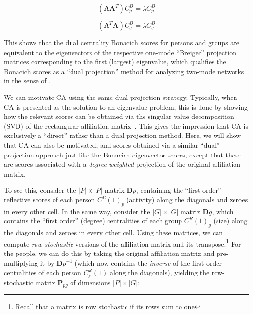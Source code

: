 \documentclass[a4paper,fleqn]{cas-sc}
\begin{document}
\begin{equation}
    \left(\mathbf{AA}^T\right)C^B_p = \lambda C^B_p
    \label{eq:bon3}
\end{equation}

\begin{equation}
    \left(\mathbf{A}^T\mathbf{A}\right)C^B_g = \lambda C^B_g
    \label{eq:bon4}
\end{equation}

This shows that the dual centrality Bonacich scores for persons and groups are equivalent to the eigenvectors of the respective one-mode ``Breiger'' \citeyearpar{breiger1974duality} projection matrices corresponding to the first (largest) eigenvalue, which qualifies the Bonacich scores as a ``dual projection'' method for analyzing two-mode networks in the sense of \citet{everett2013dual}.

We can motivate CA using the same dual projection strategy. Typically, when CA is presented as the solution to an eigenvalue problem, this is done by showing how the relevant scores can be obtained via the singular value decomposition (SVD) of the rectangular affiliation matrix~\citep{borgatti1997network, bonacich1991simultaneous, faust1997centrality, faust2005using}. This gives the impression that CA is exclusively a ``direct'' rather than a dual projection method. Here, we will show that CA can also be motivated, and scores obtained via a similar ``dual'' projection approach just like the Bonacich eigenvector scores, except that these are scores associated with a \textit{degree-weighted} projection of the original affiliation matrix.

To see this, consider the $|P| \times |P|$ matrix $\mathbf{D}p$, containing the ``first order'' reflective scores of each person $C^R(1)_p$ (activity) along the diagonals and zeroes in every other cell. In the same way, consider the $|G| \times |G|$ matrix $\mathbf{D}g$, which contains the ``first order'' (degree) centralities of each group $C^R(1)_g$ (size) along the diagonals and zeroes in every other cell. Using these matrices, we can compute \textit{row stochastic} versions of the affiliation matrix and its transpose.\footnote{Recall that a matrix is row stochastic if its rows sum to one} For the people, we can do this by taking the original affiliation matrix and pre-multiplying it by $\mathbf{D}p^{-1}$ (which now contains the \textit{inverse} of the first-order centralities of each person $C^R_p(1)$ along the diagonals), yielding the row-stochastic matrix $\mathbf{P}_{pg}$ of dimensions $|P| \times |G|$:
\end{document}
